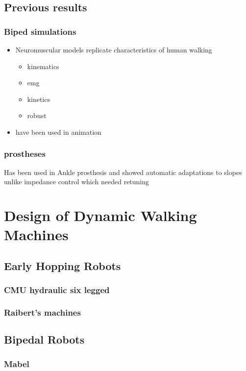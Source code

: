 \subsection{Previous results}
\subsubsection{Biped simulations}
    \begin{itemize}
        \item Neuromuscular models replicate characteristics of human walking
        \begin{itemize}
            \item kinematics
            \item emg
            \item kinetics
            \item robust
        \end{itemize}

        \item have been used in animation
    \end{itemize}

\subsubsection{prostheses}
    Has been used in Ankle prosthesis and showed automatic adaptations to slopes
    unlike impedance control which needed retuning


\section{Design of Dynamic Walking Machines}

\subsection{Early Hopping Robots}
\subsubsection{CMU hydraulic six legged}
\subsubsection{Raibert's machines}

\subsection{Bipedal Robots}
\subsubsection{Mabel}
